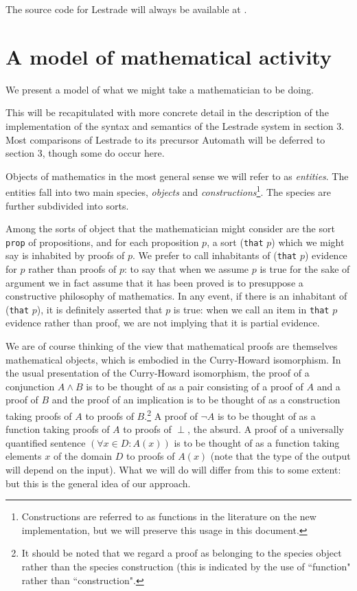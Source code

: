 \documentclass[12pt]{article}
\begin{document}
The source code for Lestrade will always be available at \cite{holmessource}.

\newpage

\section{A model of mathematical activity}

We present a model of what we might take a mathematician to be doing.

This will be recapitulated with more concrete detail in the description of the implementation of the syntax and semantics of the Lestrade system in section 3.  Most comparisons of Lestrade to its precursor Automath will be deferred to section 3, though some do occur here.

Objects of mathematics in the most general sense we will refer to as {\em entities\/}.  The entities fall into two main species, {\em objects} and {\em constructions}\footnote{Constructions are referred to as functions in the literature on the new implementation, but we will preserve this usage in this document.}.  The species are further subdivided into sorts.

Among the sorts of object that the mathematician might consider are the sort {\tt prop} of propositions, and for each proposition $p$,
a sort ({\tt that} $p$) which we might say is inhabited by proofs of $p$.  We prefer to call inhabitants of ({\tt that} $p$) evidence for $p$ rather than proofs of $p$:  to say that when we assume $p$ is true for the sake of argument we in fact assume that it has been proved is to presuppose a constructive philosophy of mathematics.  In any event, if there is an inhabitant of ({\tt that} $p$), it is definitely asserted that $p$ is true:  when we call an item in {\tt that} $p$ evidence rather than proof, we are not implying that it is partial evidence.

We are of course thinking of the view that mathematical proofs are themselves mathematical objects, which is embodied in the Curry-Howard isomorphism.  In the usual presentation of the Curry-Howard isomorphism, the proof of a conjunction
$A \wedge B$ is to be thought of as a pair consisting of a proof of $A$ and a proof of $B$ and the  proof of an implication is to be thought of as a construction taking proofs of $A$ to proofs of $B$.\footnote{It should be noted that  we regard a proof as belonging to the species object rather than the species construction (this is indicated by the use of ``function" rather than ``construction".}
A proof of $\neg A$ is to be thought of as a function taking proofs of $A$ to proofs of $\perp$, the absurd.  A proof of a universally quantified sentence $(\forall x \in D:A(x))$ is to be thought of as a function taking elements $x$ of the domain $D$ to proofs of $A(x)$ (note that the type of the output will depend on the input).  What we will do will differ from this to some extent:  but this is the general idea of our approach.
\end{document}
